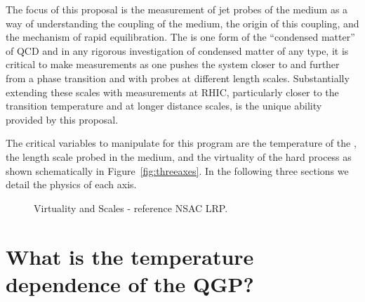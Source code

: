 The focus of this proposal is the measurement of jet probes of the
medium as a way of understanding the coupling of the medium, the
origin of this coupling, and the mechanism of rapid equilibration.
The \qgp is one form of the ``condensed matter''
of QCD and in any rigorous investigation of condensed matter of any
type, it is critical to make measurements as one pushes the system
closer to and further from a phase transition and with probes at
different length scales.  
Substantially extending these scales with measurements at RHIC, particularly closer 
to the transition temperature and at longer distance scales, is the unique ability provided by this proposal.


The critical variables to manipulate for this program are the temperature of
the \qgp, the length scale probed in the medium, and the virtuality of
the hard process as shown schematically in Figure~\ref{fig:threeaxes}.
In the following three sections we detail the physics of each axis.

\begin{figure}[!hbt]
 \begin{center}
    \caption[Virtuality and Scale]{Virtuality and Scales - reference NSAC LRP.
    \label{fig:sidebar2}}
 \end{center}
\end{figure}

\section{What is the temperature dependence of the QGP?}
\label{sec:temperature_dependence}


